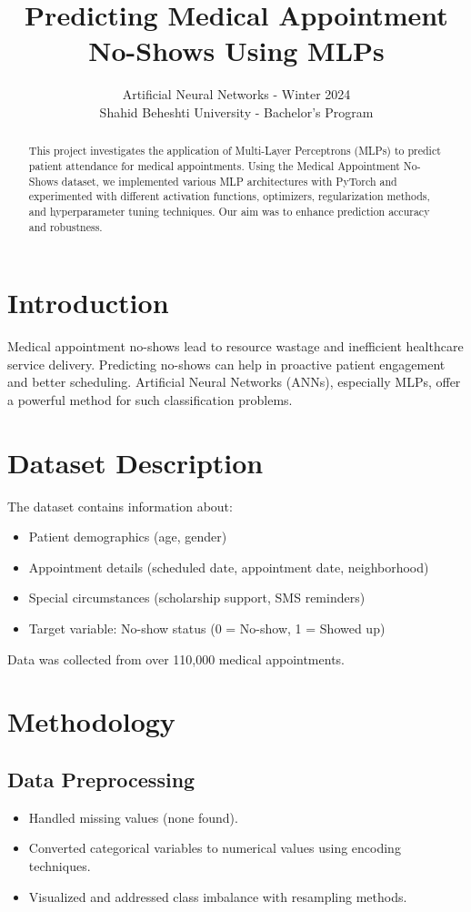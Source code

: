 \documentclass[12pt]{article}
\title{Predicting Medical Appointment No-Shows Using MLPs}
\author{Artificial Neural Networks - Winter 2024 \\ Shahid Beheshti University - Bachelor's Program}
\date{}
\begin{document}
\maketitle

\begin{abstract}
This project investigates the application of Multi-Layer Perceptrons (MLPs) to predict patient attendance for medical appointments. Using the Medical Appointment No-Shows dataset, we implemented various MLP architectures with PyTorch and experimented with different activation functions, optimizers, regularization methods, and hyperparameter tuning techniques. Our aim was to enhance prediction accuracy and robustness.
\end{abstract}

\section{Introduction}
Medical appointment no-shows lead to resource wastage and inefficient healthcare service delivery. Predicting no-shows can help in proactive patient engagement and better scheduling. Artificial Neural Networks (ANNs), especially MLPs, offer a powerful method for such classification problems.

\section{Dataset Description}
The dataset contains information about:
\begin{itemize}
    \item Patient demographics (age, gender)
    \item Appointment details (scheduled date, appointment date, neighborhood)
    \item Special circumstances (scholarship support, SMS reminders)
    \item Target variable: No-show status (0 = No-show, 1 = Showed up)
\end{itemize}
Data was collected from over 110,000 medical appointments.

\section{Methodology}

\subsection{Data Preprocessing}
\begin{itemize}
    \item Handled missing values (none found).
    \item Converted categorical variables to numerical values using encoding techniques.
    \item Visualized and addressed class imbalance with resampling methods.
\end{itemize}
\end{document}
